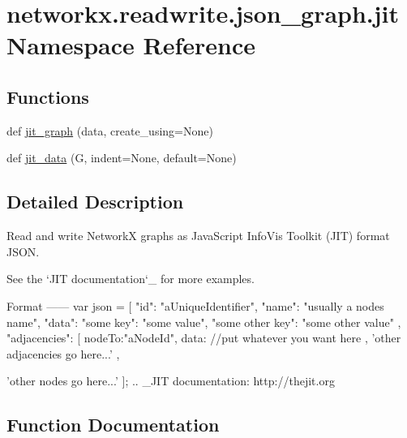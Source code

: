 \hypertarget{namespacenetworkx_1_1readwrite_1_1json__graph_1_1jit}{}\section{networkx.\+readwrite.\+json\+\_\+graph.\+jit Namespace Reference}
\label{namespacenetworkx_1_1readwrite_1_1json__graph_1_1jit}
\subsection*{Functions}
\begin{DoxyCompactItemize}
\item 
def \hyperlink{namespacenetworkx_1_1readwrite_1_1json__graph_1_1jit_a24093822676235f68daa49c91aa59f80}{jit\+\_\+graph} (data, create\+\_\+using=None)
\item 
def \hyperlink{namespacenetworkx_1_1readwrite_1_1json__graph_1_1jit_aa2a08dc2fba6c025bc94949ee464152f}{jit\+\_\+data} (G, indent=None, default=None)
\end{DoxyCompactItemize}


\subsection{Detailed Description}
\begin{DoxyVerb}Read and write NetworkX graphs as JavaScript InfoVis Toolkit (JIT) format JSON.

See the `JIT documentation`_ for more examples.

Format
------
var json = [
  {
    "id": "aUniqueIdentifier",
    "name": "usually a nodes name",
    "data": {
      "some key": "some value",
      "some other key": "some other value"
     },
    "adjacencies": [
    {
      nodeTo:"aNodeId",
      data: {} //put whatever you want here
    },
    'other adjacencies go here...'
  },

  'other nodes go here...'
];
.. _JIT documentation: http://thejit.org
\end{DoxyVerb}
 

\subsection{Function Documentation}
\mbox{\label{namespacenetworkx_1_1readwrite_1_1json__graph_1_1jit_aa2a08dc2fba6c025bc94949ee464152f}} 
